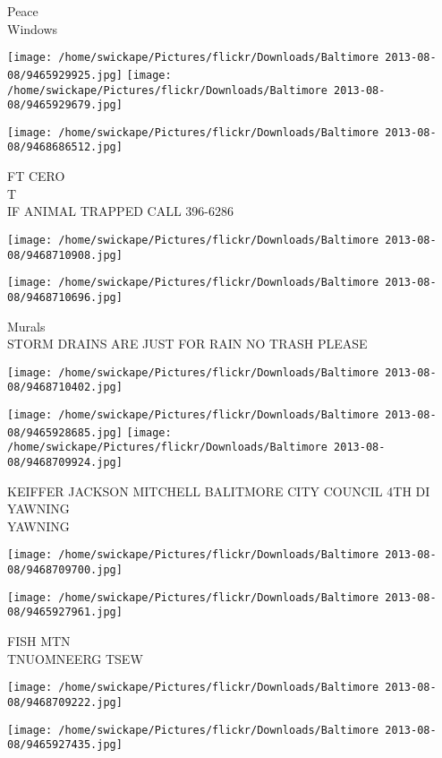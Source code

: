 \documentclass[10pt,letterpaper]{article}
\begin{document}
Peace\\
Windows
\pagebreak

\texttt{[image: /home/swickape/Pictures/flickr/Downloads/Baltimore 2013-08-08/9465929925.jpg]}
\texttt{[image: /home/swickape/Pictures/flickr/Downloads/Baltimore 2013-08-08/9465929679.jpg]}

\texttt{[image: /home/swickape/Pictures/flickr/Downloads/Baltimore 2013-08-08/9468686512.jpg]}

FT CERO\\
T\\
IF ANIMAL TRAPPED CALL 396{-}6286
\pagebreak

\texttt{[image: /home/swickape/Pictures/flickr/Downloads/Baltimore 2013-08-08/9468710908.jpg]}

\vspace{0.25in}
\texttt{[image: /home/swickape/Pictures/flickr/Downloads/Baltimore 2013-08-08/9468710696.jpg]}

Murals\\
STORM DRAINS ARE JUST FOR RAIN NO TRASH PLEASE
\pagebreak

\texttt{[image: /home/swickape/Pictures/flickr/Downloads/Baltimore 2013-08-08/9468710402.jpg]}

\vspace{0.25in}
\texttt{[image: /home/swickape/Pictures/flickr/Downloads/Baltimore 2013-08-08/9465928685.jpg]}
\texttt{[image: /home/swickape/Pictures/flickr/Downloads/Baltimore 2013-08-08/9468709924.jpg]}

KEIFFER JACKSON MITCHELL BALITMORE CITY COUNCIL 4TH DI\\
YAWNING\\
YAWNING
\pagebreak

\texttt{[image: /home/swickape/Pictures/flickr/Downloads/Baltimore 2013-08-08/9468709700.jpg]}

\vspace{0.25in}
\texttt{[image: /home/swickape/Pictures/flickr/Downloads/Baltimore 2013-08-08/9465927961.jpg]}

FISH MTN\\
TNUOMNEERG TSEW
\pagebreak

\texttt{[image: /home/swickape/Pictures/flickr/Downloads/Baltimore 2013-08-08/9468709222.jpg]}

\vspace{0.25in}
\texttt{[image: /home/swickape/Pictures/flickr/Downloads/Baltimore 2013-08-08/9465927435.jpg]}
\end{document}
